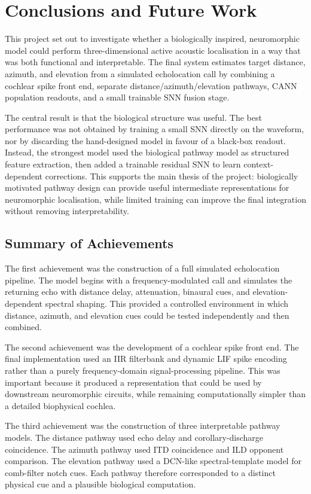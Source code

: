\chapter{Conclusions and Future Work} \label{ch:conclusions}

This project set out to investigate whether a biologically inspired, neuromorphic model could perform three-dimensional active acoustic localisation in a way that was both functional and interpretable. The final system estimates target distance, azimuth, and elevation from a simulated echolocation call by combining a cochlear spike front end, separate distance/azimuth/elevation pathways, CANN population readouts, and a small trainable SNN fusion stage.

The central result is that the biological structure was useful. The best performance was not obtained by training a small SNN directly on the waveform, nor by discarding the hand-designed model in favour of a black-box readout. Instead, the strongest model used the biological pathway model as structured feature extraction, then added a trainable residual SNN to learn context-dependent corrections. This supports the main thesis of the project: biologically motivated pathway design can provide useful intermediate representations for neuromorphic localisation, while limited training can improve the final integration without removing interpretability.

\section{Summary of Achievements}

The first achievement was the construction of a full simulated echolocation pipeline. The model begins with a frequency-modulated call and simulates the returning echo with distance delay, attenuation, binaural cues, and elevation-dependent spectral shaping. This provided a controlled environment in which distance, azimuth, and elevation cues could be tested independently and then combined.

The second achievement was the development of a cochlear spike front end. The final implementation used an IIR filterbank and dynamic LIF spike encoding rather than a purely frequency-domain signal-processing pipeline. This was important because it produced a representation that could be used by downstream neuromorphic circuits, while remaining computationally simpler than a detailed biophysical cochlea.

The third achievement was the construction of three interpretable pathway models. The distance pathway used echo delay and corollary-discharge coincidence. The azimuth pathway used ITD coincidence and ILD opponent comparison. The elevation pathway used a DCN-like spectral-template model for comb-filter notch cues. Each pathway therefore corresponded to a distinct physical cue and a plausible biological computation.

